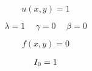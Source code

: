 \documentclass[12pt,a4paper]{article}
\newcommand{\romannumeralcaps}[1]{\MakeUppercase{\romannumeral #1}}
\begin{document}
    \thispagestyle{empty}

    \Large

    \[ u(x,y) = 1 \]

    \[
    \lambda = 1 \hspace{15pt}
    \gamma  = 0 \hspace{15pt}
    \beta   = 0
    \]

    \[ f(x,y) = 0 \]

    \begin{eqnarray*}
        \romannumeralcaps{1}_0 = 1
    \end{eqnarray*}
\end{document}

